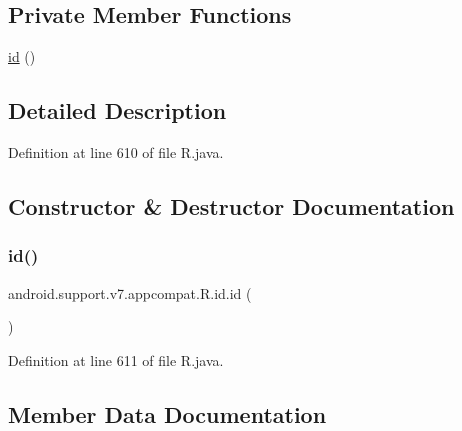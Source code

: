 \subsection*{Private Member Functions}
\begin{DoxyCompactItemize}
\item 
\mbox{\hyperlink{classandroid_1_1support_1_1v7_1_1appcompat_1_1_r_1_1id_ac0a4ca60056aa9bf7c58208668315173}{id}} ()
\end{DoxyCompactItemize}


\subsection{Detailed Description}


Definition at line 610 of file R.\+java.



\subsection{Constructor \& Destructor Documentation}
\mbox{\label{classandroid_1_1support_1_1v7_1_1appcompat_1_1_r_1_1id_ac0a4ca60056aa9bf7c58208668315173}} 
\subsubsection{\texorpdfstring{id()}{id()}}
{\footnotesize\ttfamily android.\+support.\+v7.\+appcompat.\+R.\+id.\+id (\begin{DoxyParamCaption}{ }\end{DoxyParamCaption})\hspace{0.3cm}{\ttfamily [private]}}



Definition at line 611 of file R.\+java.


\begin{DoxyCode}{0}

\end{DoxyCode}


\subsection{Member Data Documentation}
\mbox{\label{classandroid_1_1support_1_1v7_1_1appcompat_1_1_r_1_1id_a6c9c8b18c3b57617cf60a9b1ad51f2f1}} 
